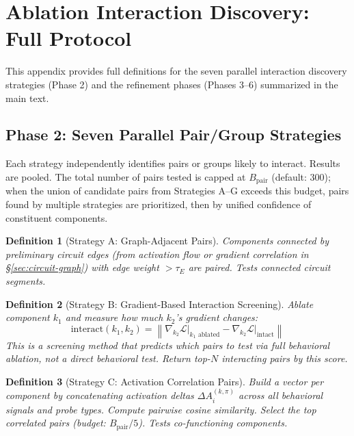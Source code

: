 \documentclass[11pt]{article}
\newtheorem{definition}{Definition}[section]
\begin{document}
\section{Ablation Interaction Discovery: Full Protocol}
\label{app:ablation-detail}

This appendix provides full definitions for the seven parallel interaction discovery strategies (Phase 2) and the refinement phases (Phases 3--6) summarized in the main text.

\subsection{Phase 2: Seven Parallel Pair/Group Strategies}

Each strategy independently identifies pairs or groups likely to interact. Results are pooled. The total number of pairs tested is capped at $B_{\text{pair}}$ (default: 300); when the union of candidate pairs from Strategies A--G exceeds this budget, pairs found by multiple strategies are prioritized, then by unified confidence of constituent components.

\begin{definition}[Strategy A: Graph-Adjacent Pairs]
Components connected by preliminary circuit edges (from activation flow or gradient correlation in \S\ref{sec:circuit-graph}) with edge weight $> \tau_E$ are paired. Tests connected circuit segments.
\end{definition}

\begin{definition}[Strategy B: Gradient-Based Interaction Screening]
Ablate component $k_1$ and measure how much $k_2$'s gradient changes:
\begin{equation}
\text{interact}(k_1, k_2) = \left\|\nabla_{k_2} \mathcal{L}\big|_{k_1\text{ ablated}} - \nabla_{k_2} \mathcal{L}\big|_{\text{intact}}\right\|
\end{equation}
This is a screening method that predicts which pairs to test via full behavioral ablation, not a direct behavioral test. Return top-$N$ interacting pairs by this score.
\end{definition}

\begin{definition}[Strategy C: Activation Correlation Pairs]
Build a vector per component by concatenating activation deltas $\Delta A^{(k,\pi)}_i$ across all behavioral signals and probe types. Compute pairwise cosine similarity. Select the top correlated pairs (budget: $B_{\text{pair}} / 5$). Tests co-functioning components.
\end{definition}
\end{document}
